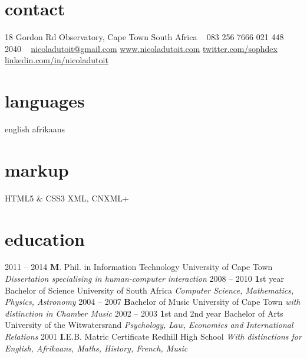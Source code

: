 \documentclass[]{friggeri-cv} %
\begin{document}


\begin{aside} %
\section{contact}
18 Gordon Rd
Observatory, Cape Town
South Africa
~
083 256 7666
021 448 2040
~
\href{mailto:nicoladutoit@gmail.com}{nicoladutoit@gmail.com}
\href{http://www.nicoladutoit.com}{www.nicoladutoit.com}
\href{https://twitter.com/sophdex}{twitter.com/sophdex}
\hspace{-20pt}\href{http://za.linkedin.com/in/nicoladutoit/}{linkedin.com/in/nicoladutoit}
\section{languages}
english 
afrikaans
\section{markup}
HTML5 \& CSS3
XML, CNXML+
\end{aside}


\section{education}

\begin{entrylist}
\entry
{2011 -- 2014}
{\textbf M. Phil. in Information Technology}
{University of Cape Town}
{\emph{Dissertation specialising in human-computer interaction}}
\entry
{2008 -- 2010}
{\textbf 1st year Bachelor of Science}
{University of South Africa}
{\emph{Computer Science, Mathematics, Physics, Astronomy}}
\entry
{2004 -- 2007}
{\textbf Bachelor of Music}
{University of Cape Town}
{\emph{with distinction in Chamber Music}}
\entry
{2002 -- 2003}
{\textbf 1st and 2nd year Bachelor of Arts}
{University of the Witwatersrand}
{\emph{Psychology, Law, Economics and International Relations}}
\entry
{2001}
{\textbf I.E.B. Matric Certificate }
{Redhill High School}
{\emph{With distinctions for English, Afrikaans, Maths, History, French, Music}}

\end{entrylist}
\end{document}
